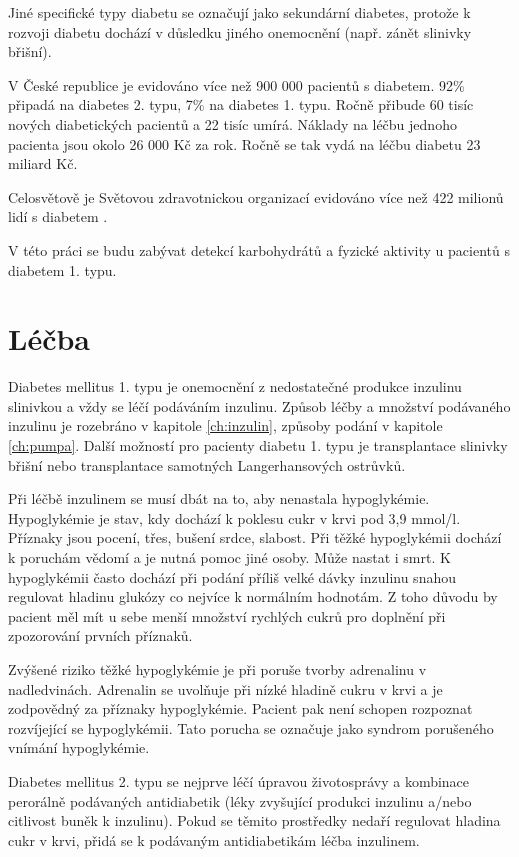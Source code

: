 Jiné specifické typy diabetu se označují jako sekundární diabetes, protože k rozvoji diabetu dochází v důsledku jiného onemocnění (např. zánět slinivky břišní).

V České republice je evidováno více než 900 000 pacientů s diabetem. 92\% připadá na diabetes 2. typu, 7\% na diabetes 1. typu. Ročně přibude 60 tisíc nových diabetických pacientů a 22 tisíc umírá. Náklady na léčbu jednoho pacienta jsou okolo 26 000 Kč za rok. Ročně se tak vydá na léčbu diabetu 23 miliard Kč. \cite{Diabetes.Psottova,cukrovka.cz,Diabetes.TaiN}

Celosvětově je Světovou zdravotnickou organizací evidováno více než 422 milionů lidí s diabetem \cite{WHO}.

V této práci se budu zabývat detekcí karbohydrátů a fyzické aktivity u pacientů s diabetem 1. typu.


\section{Léčba}

Diabetes mellitus 1. typu je onemocnění z nedostatečné produkce inzulinu slinivkou a vždy se léčí podáváním inzulinu. Způsob léčby a množství podávaného inzulinu je rozebráno v kapitole \ref{ch:inzulin}, způsoby podání v kapitole \ref{ch:pumpa}. Další možností pro pacienty diabetu 1. typu je transplantace slinivky břišní nebo transplantace samotných Langerhansových ostrůvků.

Při léčbě inzulinem se musí dbát na to, aby nenastala hypoglykémie. Hypoglykémie je stav, kdy dochází k poklesu cukr v krvi pod 3,9 mmol/l. Příznaky jsou pocení, třes, bušení srdce, slabost. Při těžké hypoglykémii dochází k poruchám vědomí a je nutná pomoc jiné osoby. Může nastat i smrt. K hypoglykémii často dochází při podání příliš velké dávky inzulinu snahou regulovat hladinu glukózy co nejvíce k normálním hodnotám. Z toho důvodu by pacient měl mít u sebe menší množství rychlých cukrů pro doplnění při zpozorování prvních příznaků.

Zvýšené riziko těžké hypoglykémie je při poruše tvorby adrenalinu v nadledvinách. Adrenalin se uvolňuje při nízké hladině cukru v krvi a je zodpovědný za příznaky hypoglykémie. Pacient pak není schopen rozpoznat rozvíjející se hypoglykémii. Tato porucha se označuje jako syndrom porušeného vnímání hypoglykémie.

Diabetes mellitus 2. typu se nejprve léčí úpravou životosprávy a kombinace perorálně podávaných antidiabetik (léky zvyšující produkci inzulinu a/nebo citlivost buněk k inzulinu). Pokud se těmito prostředky nedaří regulovat hladina cukr v krvi, přidá se k podávaným antidiabetikám léčba inzulinem.

